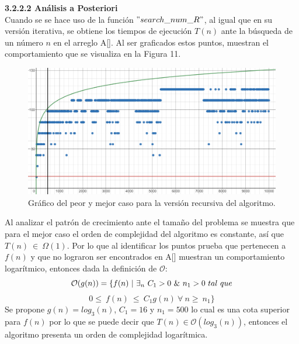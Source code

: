 \documentclass[12pt,twoside]{article}
\begin{document}
                {\bf 3.2.2.2 An\'alisis a Posteriori}\\[0.2cm]
                Cuando se se hace uso de la funci\'on \textit{$"search\_num\_R"$}, al igual que en su versi\'on iterativa, se obtiene los tiempos de ejecuci\'on $T(n)$ ante la b\'usqueda de un n\'umero $n$ en el arreglo A[]. Al ser graficados estos puntos, muestran el comportamiento que se visualiza en la Figura 11.
                \begin{figure}[H]
                    \centering
                     \includegraphics[width=14cm]{imagenes/figura3_2_4.png}
                    \caption{Gráfico del peor y mejor caso para la versi\'on recursiva del algoritmo.}
                \end{figure}
                Al analizar el patr\'on de crecimiento ante el tama\~no del problema se muestra que para el mejor caso el orden de complejidad del algoritmo es constante, as\'i que $T(n)~\in~\Omega(1)$. Por lo que al identificar los puntos prueba que pertenecen a $f(n)$ y que no lograron ser encontrados en A[] muestran un comportamiento logar\'itmico, entonces dada la definici\'on de $\mathcal{O}$:
                $$\mathcal{O}(g(n)) = \{ f(n)~\arrowvert~\exists_{n}~C_{1}>0~\&~n_{1}>0~tal~que$$$$0\leq~f(n)~\leq~C_{1}g(n)~\forall~n\geq~n_{1}\}$$
                Se propone $g(n)=log_{3}(n)$, $C_{1}=16$ y $n_{1}=500$ lo cual es una cota superior para $f(n)$ por lo que se puede decir que $T(n)\in\mathcal{O}(log_{3}(n))$, entonces el algoritmo presenta un orden de complejidad logar\'itmica. 
\end{document}
